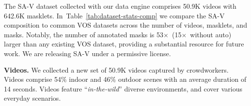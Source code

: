 \documentclass[]{fairmeta}
\renewcommand{\paragraph}[1]{\vspace{1.25mm}\noindent\textbf{#1}}
\newcommand{\x}{{\times}}
\def\x{$\times$}
\newcommand{\tabref}[1]{Table~\ref{#1}}
\newcommand{\savinumvideos}{50.9K\xspace} %
\newcommand{\savinummaskletsWAuto}{642.6K\xspace}  %
\newcommand{\saviMoreMasksWAutoRate}{53\x\xspace}  %
\newcommand{\saviMoreMasksRate}{15\x\xspace}  %
\renewcommand{\paragraph}[1]{\vspace{1.25mm}\noindent\textbf{#1}}
\begin{document}
The SA-V dataset collected with our data engine comprises \savinumvideos videos with \savinummaskletsWAuto masklets. In~\tabref{tab:dataset-stats-comp} we compare the SA-V composition to common VOS datasets across the number of videos, masklets, and masks. Notably, the number of annotated masks is \saviMoreMasksWAutoRate~(\saviMoreMasksRate~without auto) larger than any existing VOS dataset, providing a substantial resource for future work. We are releasing SA-V under a permissive license.


\paragraph{Videos.} We collected a new set of \savinumvideos videos captured by crowdworkers. Videos comprise 54\% indoor and 46\% outdoor scenes with an average duration of 14 seconds. Videos feature ``\textit{in-the-wild}'' diverse environments, and cover various everyday scenarios. 
\end{document}
